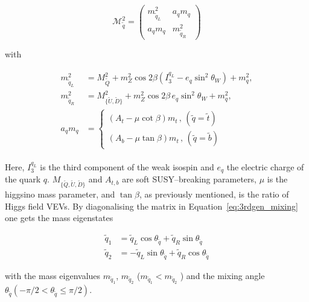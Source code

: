 				\begin{equation}
				\label{eq:3rdgen_mixing}
					\mathcal {M}_{\tilde{q}}^2 = 
					\begin{pmatrix}
						m_{\tilde{q}_L}^2 & a_q m_q \\
						a_q m_q & m_{\tilde{q}_R}^2
					\end{pmatrix}
				\end{equation}

				\noindent with 

				\begin{align}
				\label{eq:msqL}
					\begin{split}
						m_{\tilde{q}_L}^2 & = M_{\tilde{Q}}^2 + m_Z^2 \cos 2\beta \left ( I_3^{q_L} - e_q \sin^2 \theta_W \right ) + m_q^2 ,
						\\ 
						m_{\tilde{q}_R}^2 & = M_{{\{ \tilde{U},\tilde{D} \}}}^2 + m_Z^2 \cos 2\beta\, e_q \sin^2 \theta_W  + m_q^2 , 
						\\
						a_q m_q & = 
						\begin{cases}
							\left ( A_t - \mu \cot \beta \right ) m_t\, , \, (\tilde{q} = \tilde{t}) \\  
							\left ( A_b - \mu \tan \beta \right ) m_t\, , \, (\tilde{q} = \tilde{b})  
						\end{cases}
					\end{split}
				\end{align}

				\noindent Here, $I_3^{q_L}$ is the third component of the weak isospin and $e_q$ the electric charge of the quark $q$. $M_{{\{ \tilde{Q},\tilde{U},\tilde{D} \}}}$ and $A_{t,b}$ are soft \ac{SUSY}–breaking parameters, $\mu$ is the higgsino mass parameter, and $\tan \beta$, as previously mentioned, is the ratio of Higgs field \ac{VEV}s. By diagonalising the matrix in Equation~\ref{eq:3rdgen_mixing} one gets the mass eigenstates 
				
				\begin{align}
					\tilde{q}_1 & = \tilde{q}_L \cos \theta_{\tilde{q}} + \tilde{q}_R \sin \theta_{\tilde{q}} \\
					\tilde{q}_2 & = - \tilde{q}_L \sin \theta_{\tilde{q}} + \tilde{q}_R \cos \theta_{\tilde{q}}
				\end{align}
				
				\noindent with the mass eigenvalues $m_{\tilde{q}_1}$, $m_{\tilde{q}_2}$ ($m_{\tilde{q}_1} < m_{\tilde{q}_2}$ ) and the mixing angle $\theta_{\tilde{q}} \left (- \pi / 2 < \theta_{\tilde{q}} \leq \pi / 2 \right )$. 
				



